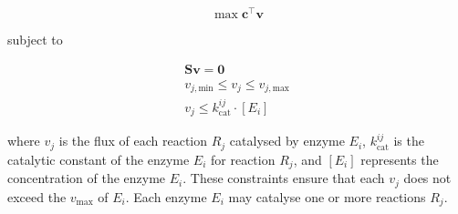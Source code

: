 \begin{equation}
  \max \mathbf{c}^{\intercal} \mathbf{v}
  \label{eq:model-gecko-fba-objective}
\end{equation}

subject to

\begin{equation}
  \begin{gathered}
    \mathbf{S} \mathbf{v} = \mathbf{0}\\
    v_{j,\mathrm{min}} \leq v_{j} \leq v_{j,\mathrm{max}}\\
    v_{j} \leq k_{\mathrm{cat}}^{ij} \cdot [E_{i}]
  \end{gathered}
  \label{eq:model-gecko-fba-constraints}
\end{equation}

where $v_{j}$ is the flux of each reaction $R_{j}$ catalysed by enzyme $E_{i}$, $k_{\mathrm{cat}}^{ij}$ is the catalytic constant of the enzyme $E_{i}$ for reaction $R_{j}$, and $[E_{i}]$ represents the concentration of the enzyme $E_{i}$.
These constraints ensure that each $v_{j}$ does not exceed the $v_{\mathrm{max}}$ of $E_{i}$.
Each enzyme $E_{i}$ may catalyse one or more reactions $R_{j}$.




